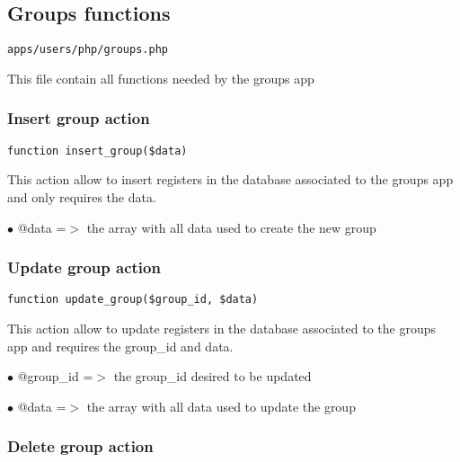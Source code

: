\documentclass[a4paper]{article}
\begin{document}
\hypertarget{toc183}{}
\subsection{Groups functions}

\begin{lstlisting}
apps/users/php/groups.php
\end{lstlisting}

This file contain all functions needed by the groups app

\hypertarget{toc184}{}
\subsubsection{Insert group action}

\begin{lstlisting}
function insert_group($data)
\end{lstlisting}

This action allow to insert registers in the database associated to
the groups app and only requires the data.

\begin{compactitem}
\item[\color{myblue}$\bullet$] @data =$>$ the array with all data used to create the new group
\end{compactitem}

\hypertarget{toc185}{}
\subsubsection{Update group action}

\begin{lstlisting}
function update_group($group_id, $data)
\end{lstlisting}

This action allow to update registers in the database associated to
the groups app and requires the group\_id and data.

\begin{compactitem}
\item[\color{myblue}$\bullet$] @group\_id =$>$ the group\_id desired to be updated
\item[\color{myblue}$\bullet$] @data     =$>$ the array with all data used to update the group
\end{compactitem}

\hypertarget{toc186}{}
\subsubsection{Delete group action}
\end{document}
